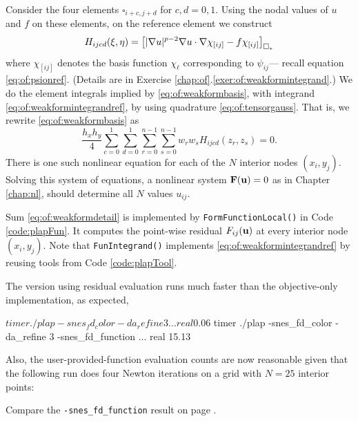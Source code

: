
Consider the four elements $\square_{i+c,j+d}$ for $c,d=0,1$.  Using the nodal values of $u$ and $f$ on these elements, on the reference element we construct
\begin{equation}
H_{ijcd}(\xi,\eta) = \left[|\nabla u|^{p-2} \nabla u \cdot \nabla \chi_{[ij]} - f \chi_{[ij]}\right]_{\square_\ast} \label{eq:of:weakformintegrandref}
\end{equation}
where $\chi_{[ij]}$ denotes the basis function $\chi_\ell$ corresponding to $\psi_{ij}$--- recall equation \eqref{eq:of:psionref}. (Details are in Exercise \ref{chap:of}.\ref{exer:of:weakformintegrand}.)  We do the element integrals implied by \eqref{eq:of:weakformbasis}, with integrand \eqref{eq:of:weakformintegrandref}, by using quadrature \eqref{eq:of:tensorgauss}.  That is, we rewrite \eqref{eq:of:weakformbasis} as
\begin{equation}
\frac{h_x h_y}{4} \sum_{c=0}^1 \sum_{d=0}^1 \sum_{r=0}^{n-1} \sum_{s=0}^{n-1} w_r w_s H_{ijcd}(z_r,z_s) = 0.  \label{eq:of:weakformdetail}
\end{equation}
There is one such nonlinear equation for each of the $N$ interior nodes $(x_i,y_j)$.  Solving this system of equations, a nonlinear system $\mathbf{F}(\mathbf{u})=0$ as in Chapter \ref{chap:nl}, should determine all $N$ values $u_{ij}$.

Sum \eqref{eq:of:weakformdetail} is implemented by \texttt{FormFunctionLocal()} in Code \ref{code:plapFun}.  It computes the point-wise residual $F_{ij}(\mathbf{u})$ at every interior node $(x_i,y_j)$.  Note that \texttt{FunIntegrand()} implements \eqref{eq:of:weakformintegrandref} by reusing tools from Code \ref{code:plapTool}.

The version using residual evaluation runs much faster than the objective-only implementation, as expected,
\begin{cline}
$ timer ./plap -snes_fd_color -da_refine 3
...
real 0.06
$ timer ./plap -snes_fd_color -da_refine 3 -snes_fd_function
...
real 15.13
\end{cline}
Also, the user-provided-function evaluation counts are now reasonable given that the following run does four Newton iterations on a grid with $N=25$ interior points:
Compare the \texttt{-snes\_fd\_function} result on page \pageref{page:of:badEvalcount}.


